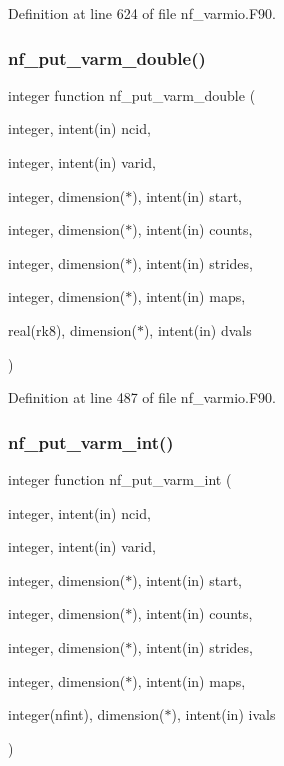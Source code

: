Definition at line 624 of file nf\+\_\+varmio.\+F90.

\mbox{\label{nf__varmio_8F90_adfa1827cacd22637d30071bbccce558d}} 
\subsubsection{\texorpdfstring{nf\+\_\+put\+\_\+varm\+\_\+double()}{nf\_put\_varm\_double()}}
{\footnotesize\ttfamily integer function nf\+\_\+put\+\_\+varm\+\_\+double (\begin{DoxyParamCaption}\item[{integer, intent(in)}]{ncid,  }\item[{integer, intent(in)}]{varid,  }\item[{integer, dimension($\ast$), intent(in)}]{start,  }\item[{integer, dimension($\ast$), intent(in)}]{counts,  }\item[{integer, dimension($\ast$), intent(in)}]{strides,  }\item[{integer, dimension($\ast$), intent(in)}]{maps,  }\item[{real(rk8), dimension($\ast$), intent(in)}]{dvals }\end{DoxyParamCaption})}



Definition at line 487 of file nf\+\_\+varmio.\+F90.

\mbox{\label{nf__varmio_8F90_af8be27770cbc46dc207a458c0592a17b}} 
\subsubsection{\texorpdfstring{nf\+\_\+put\+\_\+varm\+\_\+int()}{nf\_put\_varm\_int()}}
{\footnotesize\ttfamily integer function nf\+\_\+put\+\_\+varm\+\_\+int (\begin{DoxyParamCaption}\item[{integer, intent(in)}]{ncid,  }\item[{integer, intent(in)}]{varid,  }\item[{integer, dimension($\ast$), intent(in)}]{start,  }\item[{integer, dimension($\ast$), intent(in)}]{counts,  }\item[{integer, dimension($\ast$), intent(in)}]{strides,  }\item[{integer, dimension($\ast$), intent(in)}]{maps,  }\item[{integer(nfint), dimension($\ast$), intent(in)}]{ivals }\end{DoxyParamCaption})}



